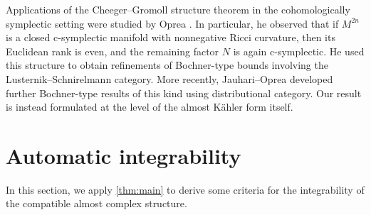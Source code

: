 \documentclass[11pt,twoside]{amsart}
\newcommand{\R}{\mathbb{R}}
\newcommand{\C}{\mathbb{C}}
\begin{document}
\begin{remark}
 Applications of the Cheeger--Gromoll structure theorem in the cohomologically symplectic setting were studied by Oprea
 \cite{Oprea02}. In particular, he observed that if \(M^{2n}\) is
a closed c-symplectic manifold with nonnegative Ricci curvature, then its Euclidean rank is even, and the remaining factor $N$ is again c-symplectic. He used this structure to obtain refinements of
 Bochner-type bounds involving the Lusternik--Schnirelmann category.
 More recently, Jauhari--Oprea \cite{JO26} developed
 further Bochner-type results of this kind using distributional category. Our result is instead formulated at the level of the almost K\"ahler form itself.
\end{remark}



\section{Automatic integrability}\label{section:Kahlerness}
In this section, we apply \autoref{thm:main} to derive some criteria for the integrability of the compatible almost complex structure.
\end{document}
